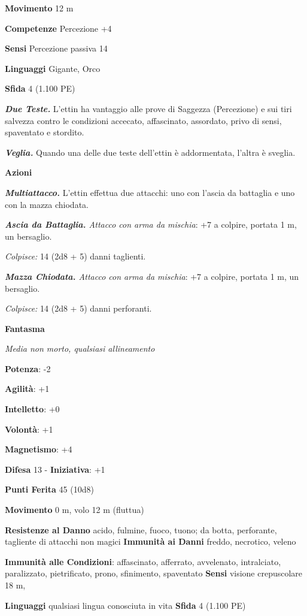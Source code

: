 \begin{multicols}{2}
\textbf{Movimento} 12 m

\textbf{Competenze} Percezione +4

\textbf{Sensi} Percezione passiva 14

\textbf{Linguaggi} Gigante, Orco

\textbf{Sfida} 4 (1.100 PE)\smallskip

\emph{\textbf{Due Teste.}} L'ettin ha vantaggio alle prove di Saggezza
(Percezione) e sui tiri salvezza contro le condizioni accecato,
affascinato, assordato, privo di sensi, spaventato e stordito.

\emph{\textbf{Veglia.}} Quando una delle due teste dell'ettin è
addormentata, l'altra è sveglia.

\smallskip\textbf{Azioni}

\emph{\textbf{Multiattacco.}} L'ettin effettua due attacchi: uno con
l'ascia da battaglia e uno con la mazza chiodata.

\emph{\textbf{Ascia da Battaglia.} Attacco con arma da mischia}: +7 a
colpire, portata 1 m, un bersaglio.

\emph{Colpisce:} 14 (2d8 + 5) danni taglienti.

\emph{\textbf{Mazza Chiodata.} Attacco con arma da mischia}: +7 a
colpire, portata 1 m, un bersaglio.

\emph{Colpisce:} 14 (2d8 + 5) danni perforanti.

\textbf{Fantasma}

\emph{Media non morto, qualsiasi allineamento}

\textbf{Potenza}: -2

\textbf{Agilità}: +1

\textbf{Intelletto}: +0

\textbf{Volontà}: +1

\textbf{Magnetismo}: +4

\textbf{Difesa} 13 - \textbf{Iniziativa}: +1

\textbf{Punti Ferita} 45 (10d8)

\textbf{Movimento} 0 m, volo 12 m (fluttua)

\textbf{Resistenze al Danno} acido, fulmine, fuoco, tuono; da botta,
perforante, tagliente di attacchi non magici \textbf{Immunità ai Danni}
freddo, necrotico, veleno

\textbf{Immunità alle Condizioni}: affascinato, afferrato, avvelenato,
intralciato, paralizzato, pietrificato, prono, sfinimento, spaventato
\textbf{Sensi} visione crepuscolare 18 m, 

\textbf{Linguaggi} qualsiasi lingua conosciuta in vita \textbf{Sfida} 4
(1.100 PE)\smallskip


\end{multicols}
